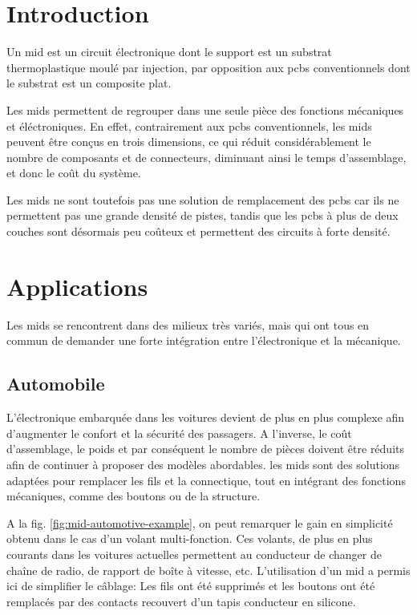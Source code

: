 \section{Introduction}
Un \gls{mid}  est un circuit électronique
dont le support est un substrat thermoplastique moulé par injection, par
opposition aux \glspl{pcb} conventionnels dont le substrat est un composite
plat.

Les \glspl{mid} permettent de regrouper dans une seule pièce des fonctions
mécaniques et éléctroniques. En effet, contrairement aux \glspl{pcb} conventionnels, les
\glspl{mid} peuvent être conçus en trois dimensions, ce qui réduit
considérablement le nombre de composants et de connecteurs, diminuant ainsi le
temps d'assemblage, et donc le coût du système. 

Les \glspl{mid} ne sont toutefois pas une solution de remplacement des
\glspl{pcb} car ils ne permettent pas une grande densité de pistes, tandis que
les \glspl{pcb} à plus de deux couches sont désormais peu coûteux et
permettent des circuits à forte densité.


\section{Applications}
Les \glspl{mid} se rencontrent dans des milieux très variés, mais qui ont tous en commun de demander une forte intégration entre l'électronique et la mécanique.

\subsection{Automobile}
L'électronique embarquée dans les voitures devient de plus en plus complexe afin d'augmenter le confort et la sécurité des passagers. 
A l'inverse, le coût d'assemblage, le poids et par conséquent le nombre de pièces doivent être réduits afin de continuer à proposer des modèles abordables.
les \glspl{mid} sont des solutions adaptées pour remplacer les fils et la connectique, tout en intégrant des fonctions mécaniques, comme des boutons ou de la structure.

A la fig. \ref{fig:mid-automotive-example}, on peut remarquer le gain en simplicité obtenu dans le cas d'un volant multi-fonction.
Ces volants, de plus en plus courants dans les voitures actuelles permettent au conducteur de changer de chaîne de radio, de rapport de boîte à vitesse, etc.
L'utilisation d'un \gls{mid} a permis ici de simplifier le câblage: Les fils ont été supprimés et les boutons ont été remplacés par des contacts recouvert d'un tapis conducteur en silicone.

